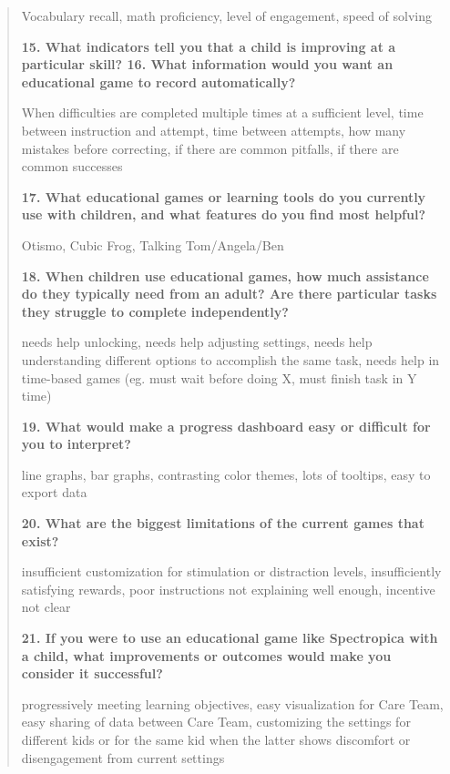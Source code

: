 \documentclass[12pt, titlepage]{article}
\begin{document}
\begin{quote}
\noindent Vocabulary recall, math proficiency, level of engagement, speed of solving

\noindent\textbf{15. What indicators tell you that a child is improving at a particular skill? 16. What information would you want an educational game to record automatically?}

\noindent When difficulties are completed multiple times at a sufficient level, time between instruction and attempt, time between attempts, how many mistakes before correcting, if there are common pitfalls, if there are common successes

\noindent\textbf{17. What educational games or learning tools do you currently use with children, and what features do you find most helpful?}

\noindent Otismo, Cubic Frog, Talking Tom/Angela/Ben

\noindent\textbf{18. When children use educational games, how much assistance do they typically need from an adult? Are there particular tasks they struggle to complete independently?}

\noindent needs help unlocking, needs help adjusting settings, needs help understanding different options to accomplish the same task, needs help in time-based games (eg. must wait before doing X, must finish task in Y time)

\noindent\textbf{19. What would make a progress dashboard easy or difficult for you to interpret?}

\noindent line graphs, bar graphs, contrasting color themes, lots of tooltips, easy to export data

\noindent\textbf{20. What are the biggest limitations of the current games that exist?}

\noindent insufficient customization for stimulation or distraction levels, insufficiently satisfying rewards, poor instructions not explaining well enough, incentive not clear

\noindent\textbf{21. If you were to use an educational game like Spectropica with a child, what improvements or outcomes would make you consider it successful?}

\noindent progressively meeting learning objectives, easy visualization for Care Team, easy sharing of data between Care Team, customizing the settings for different kids or for the same kid when the latter shows discomfort or disengagement from current settings

\end{quote}
\end{document}
